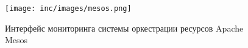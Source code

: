 \begin{figure}[ht!]
    \centering
    \texttt{[image: inc/images/mesos.png]}
    \caption{Интерфейс мониторинга системы оркестрации ресурсов Apache Mesos}\label{img:mesos}
\end{figure}
